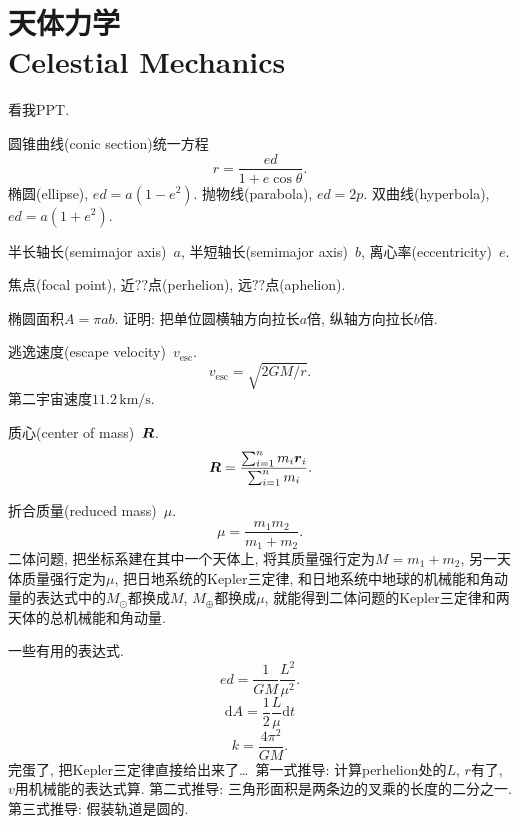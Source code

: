 \chapter{天体力学\\Celestial Mechanics}

看我PPT.

圆锥曲线(conic section)统一方程
\begin{equation*}
    r = \frac{ed}{1+e\cos\theta}.
\end{equation*}
椭圆(ellipse), $ed=a(1-e^2)$. 抛物线(parabola), $ed=2p$. 双曲线(hyperbola), $ed=a(1+e^2)$.

半长轴长(semimajor axis)~$a$, 半短轴长(semimajor axis)~$b$, 离心率(eccentricity)~$e$.

焦点(focal point), 近$\!\text{??}\!$点(perhelion), 远$\!\text{??}\!$点(aphelion).

椭圆面积$A=\pi ab$. 证明: 把单位圆横轴方向拉长$a$倍, 纵轴方向拉长$b$倍.

逃逸速度(escape velocity)~$v_\text{esc}$.
\begin{equation*}
    v_\text{esc} = \sqrt{2GM/r}.
\end{equation*}
第二宇宙速度$11.2\,\text{km/s}$.

质心(center of mass)~$\boldsymbol{R}$.
\begin{equation*}
    \boldsymbol{R} = \frac{
        \sum_{i=1}^n m_i\boldsymbol{r}_i
    }{
        \sum_{i=1}^n m_i
    }.
\end{equation*}

折合质量(reduced mass)~$\mu$.
\begin{equation*}
    \mu = \frac{m_1m_2}{m_1+m_2}.
\end{equation*}
二体问题, 把坐标系建在其中一个天体上, 将其质量强行定为$M=m_1+m_2$, 另一天体质量强行定为$\mu$, 把日地系统的Kepler三定律, 和日地系统中地球的机械能和角动量的表达式中的$M_\odot$都换成$M$, $M_\oplus$都换成$\mu$, 就能得到二体问题的Kepler三定律和两天体的总机械能和角动量.

一些有用的表达式.
\begin{equation*}
    ed = \frac{1}{GM}\frac{L^2}{\mu^2}.
\end{equation*}
\begin{equation*}
    \mathrm{d}A=\frac{1}{2}\frac{L}{\mu}\mathrm{d}t
\end{equation*}
\begin{equation*}
    k=\frac{4\pi^2}{GM}.
\end{equation*}
完蛋了, 把Kepler三定律直接给出来了\dots~第一式推导: 计算perhelion处的$L$, $r$有了, $v$用机械能的表达式算. 第二式推导: 三角形面积是两条边的叉乘的长度的二分之一. 第三式推导: 假装轨道是圆的.

